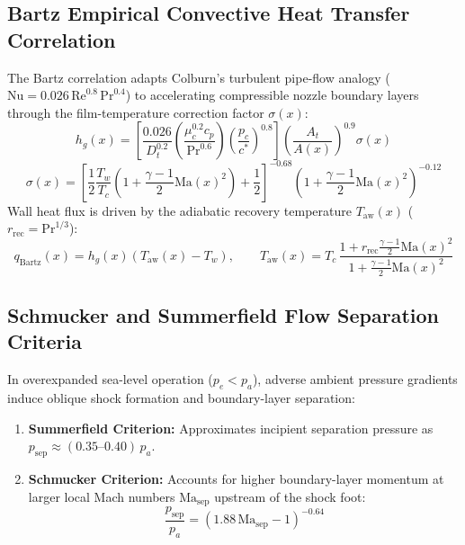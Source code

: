 \documentclass[11pt,a4paper]{article}
\begin{document}
\subsection{Bartz Empirical Convective Heat Transfer Correlation}
The Bartz correlation adapts Colburn's turbulent pipe-flow analogy ($\mathrm{Nu} = 0.026\,\mathrm{Re}^{0.8}\,\mathrm{Pr}^{0.4}$) to accelerating compressible nozzle boundary layers through the film-temperature correction factor $\sigma(x)$:
\begin{equation}
h_g(x) = \left[ \frac{0.026}{D_t^{0.2}} \left( \frac{\mu_c^{0.2} c_p}{\mathrm{Pr}^{0.6}} \right) \left( \frac{p_c}{c^*} \right)^{0.8} \right] \left( \frac{A_t}{A(x)} \right)^{0.9} \sigma(x)
\end{equation}
\begin{equation}
\sigma(x) = \left[ \frac{1}{2} \frac{T_w}{T_c} \left( 1 + \frac{\gamma - 1}{2} \mathrm{Ma}(x)^2 \right) + \frac{1}{2} \right]^{-0.68} \left( 1 + \frac{\gamma - 1}{2} \mathrm{Ma}(x)^2 \right)^{-0.12}
\end{equation}
Wall heat flux is driven by the adiabatic recovery temperature $T_{\mathrm{aw}}(x)$ ($r_{\mathrm{rec}} = \mathrm{Pr}^{1/3}$):
\begin{equation}
q_{\mathrm{Bartz}}(x) = h_g(x) \left( T_{\mathrm{aw}}(x) - T_w \right), \qquad T_{\mathrm{aw}}(x) = T_c \, \frac{1 + r_{\mathrm{rec}} \frac{\gamma - 1}{2} \mathrm{Ma}(x)^2}{1 + \frac{\gamma - 1}{2} \mathrm{Ma}(x)^2}
\end{equation}

\subsection{Schmucker and Summerfield Flow Separation Criteria}
In overexpanded sea-level operation ($p_e < p_a$), adverse ambient pressure gradients induce oblique shock formation and boundary-layer separation:
\begin{enumerate}
    \item \textbf{Summerfield Criterion:} Approximates incipient separation pressure as $p_{\mathrm{sep}} \approx (0.35\text{--}0.40)\,p_a$.
    \item \textbf{Schmucker Criterion:} Accounts for higher boundary-layer momentum at larger local Mach numbers $\mathrm{Ma}_{\mathrm{sep}}$ upstream of the shock foot:
    \begin{equation}
    \frac{p_{\mathrm{sep}}}{p_a} = \left( 1.88\,\mathrm{Ma}_{\mathrm{sep}} - 1 \right)^{-0.64}
    \end{equation}
\end{enumerate}
\end{document}
